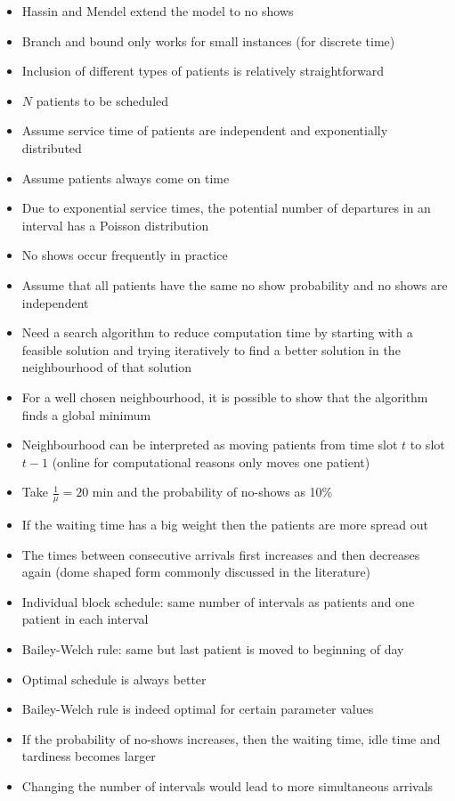 \documentclass{article}
\begin{document}
\begin{itemize}
    \item Hassin and Mendel extend the model to no shows
    \item Branch and bound only works for small instances (for discrete time)
    \item Inclusion of different types of patients is relatively straightforward
    \item $N$ patients to be scheduled
    \item Assume service time of patients are independent and exponentially distributed
    \item Assume patients always come on time
    \item Due to exponential service times, the potential number of departures in an interval has a Poisson distribution
    \item No shows occur frequently in practice
    \item Assume that all patients have the same no show probability and no shows are independent
    \item Need a search algorithm to reduce computation time by starting with a feasible solution and trying iteratively to find a better solution in the neighbourhood of that solution
    \item For a well chosen neighbourhood, it is possible to show that the algorithm finds a global minimum
    \item Neighbourhood can be interpreted as moving patients from time slot $t$ to slot $t - 1$ (online for computational reasons only moves one patient)
    \item Take $\frac{1}{\mu} = 20$ min and the probability of no-shows as 10\%
    \item If the waiting time has a big weight then the patients are more spread out
    \item The times between consecutive arrivals first increases and then decreases again (dome shaped form commonly discussed in the literature)
    \item Individual block schedule: same number of intervals as patients and one patient in each interval
    \item Bailey-Welch rule: same but last patient is moved to beginning of day
    \item Optimal schedule is always better
    \item Bailey-Welch rule is indeed optimal for certain parameter values
    \item If the probability of no-shows increases, then the waiting time, idle time and tardiness becomes larger
    \item Changing the number of intervals would lead to more simultaneous arrivals
\end{itemize}
\end{document}
